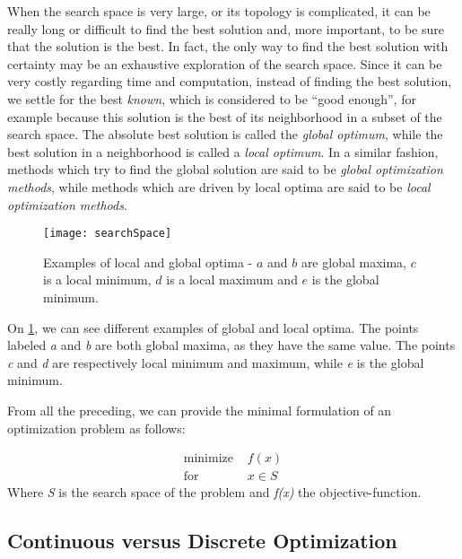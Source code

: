 When the search space is very large, or its topology is complicated, it can be really long or difficult to find the best solution and, more important, to be sure that the solution is the best. In fact, the only way to find the best solution with certainty may be an exhaustive exploration of the search space. Since it can be very costly regarding time and computation, instead of finding the best solution, we settle for the best \emph{known}, which is considered to be \enquote{good enough}, for example because this solution is the best of its neighborhood in a subset of the search space. The absolute best solution is called the \emph{global optimum}, while the best solution in a neighborhood is called a \emph{local optimum}. In a similar fashion, methods which try to find the global solution are said to be \emph{global optimization methods}, while methods which are driven by local optima are said to be \emph{local optimization methods}.


\begin{figure}
\centering
\texttt{[image: searchSpace]}
\caption{Examples of local and global optima - $a$ and $b$ are global maxima, $c$ is a local minimum, $d$ is a local maximum and $e$ is the global minimum.}
\label{localAndGlobalOptims}
\end{figure}

On \figurename{} \ref{localAndGlobalOptims}, we can see different examples of global and local optima. The points labeled \emph{a} and \emph{b} are both global maxima, as they have the same value. The points
\emph{c} and \emph{d} are respectively local minimum and maximum, while \emph{e} is the global minimum.

From all the preceding, we can provide the minimal formulation of an optimization problem as follows:

\begin{align*}
\text{minimize } &f(x) \\
\text{for } &x \in S
\end{align*}
Where \emph{S} is the search space of the problem and \emph{f(x)} the objective-function.

\subsection{Continuous versus Discrete Optimization}

